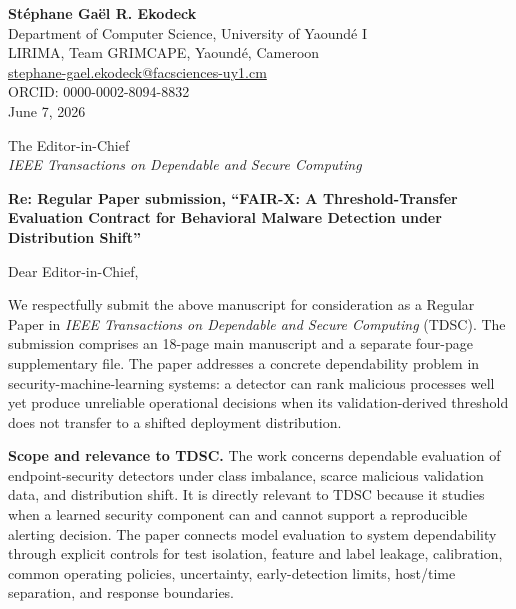 \documentclass[11pt]{article}
\begin{document}
\begin{flushright}
\textbf{St\'{e}phane Ga\"{e}l R. Ekodeck}\\
Department of Computer Science, University of Yaound\'{e} I\\
LIRIMA, Team GRIMCAPE, Yaound\'{e}, Cameroon\\
\href{mailto:stephane-gael.ekodeck@facsciences-uy1.cm}
{stephane-gael.ekodeck@facsciences-uy1.cm}\\
ORCID: 0000-0002-8094-8832\\
June 7, 2026
\end{flushright}

\vspace{2pt}

The Editor-in-Chief\\
\textit{IEEE Transactions on Dependable and Secure Computing}

\textbf{Re: Regular Paper submission, ``FAIR-X: A Threshold-Transfer
Evaluation Contract for Behavioral Malware Detection under Distribution
Shift''}

Dear Editor-in-Chief,

We respectfully submit the above manuscript for consideration as a Regular
Paper in \textit{IEEE Transactions on Dependable and Secure Computing}
(TDSC). The submission comprises an 18-page main manuscript and a separate
four-page supplementary file. The paper addresses a concrete dependability
problem in
security-machine-learning systems: a detector can rank malicious processes
well yet produce unreliable operational decisions when its validation-derived
threshold does not transfer to a shifted deployment distribution.

\textbf{Scope and relevance to TDSC.}
The work concerns dependable evaluation of endpoint-security detectors under
class imbalance, scarce malicious validation data, and distribution shift.
It is directly relevant to TDSC because it studies when a learned security
component can and cannot support a reproducible alerting decision. The paper
connects model evaluation to system dependability through explicit controls
for test isolation, feature and label leakage, calibration, common operating
policies, uncertainty, early-detection limits, host/time separation, and
response boundaries.
\end{document}
